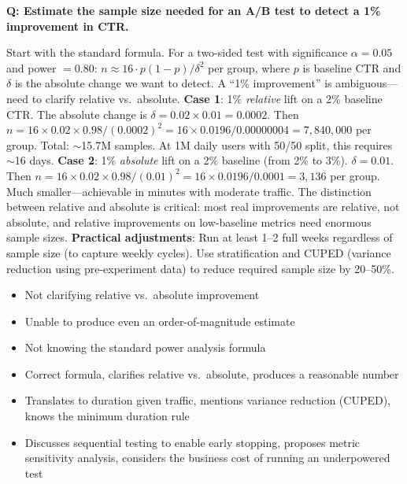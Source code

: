 \begin{interviewq}
\textbf{Q: Estimate the sample size needed for an A/B test to detect a 1\% improvement in CTR.}

 \quad {} \quad \badgefreq{\freqmed}

\stronganswer Start with the standard formula. For a two-sided test with significance $\alpha = 0.05$ and power $= 0.80$: $n \approx 16 \cdot p(1-p) / \delta^2$ per group, where $p$ is baseline CTR and $\delta$ is the absolute change we want to detect. A ``1\% improvement'' is ambiguous---need to clarify relative vs.\ absolute. \textbf{Case 1}: 1\% \textit{relative} lift on a 2\% baseline CTR. The absolute change is $\delta = 0.02 \times 0.01 = 0.0002$. Then $n = 16 \times 0.02 \times 0.98 / (0.0002)^2 = 16 \times 0.0196 / 0.00000004 = 7{,}840{,}000$ per group. Total: $\sim$15.7M samples. At 1M daily users with 50/50 split, this requires $\sim$16 days. \textbf{Case 2}: 1\% \textit{absolute} lift on a 2\% baseline (from 2\% to 3\%). $\delta = 0.01$. Then $n = 16 \times 0.02 \times 0.98 / (0.01)^2 = 16 \times 0.0196 / 0.0001 = 3{,}136$ per group. Much smaller---achievable in minutes with moderate traffic. The distinction between relative and absolute is critical: most real improvements are relative, not absolute, and relative improvements on low-baseline metrics need enormous sample sizes. \textbf{Practical adjustments}: Run at least 1--2 full weeks regardless of sample size (to capture weekly cycles). Use stratification and CUPED (variance reduction using pre-experiment data) to reduce required sample size by 20--50\%.

\redflags
\begin{itemize}
    \item Not clarifying relative vs.\ absolute improvement
    \item Unable to produce even an order-of-magnitude estimate
    \item Not knowing the standard power analysis formula
\end{itemize}


\goodgreat
\begin{itemize}
    \item {} Correct formula, clarifies relative vs.\ absolute, produces a reasonable number
    \item {} Translates to duration given traffic, mentions variance reduction (CUPED), knows the minimum duration rule
    \item {} Discusses sequential testing to enable early stopping, proposes metric sensitivity analysis, considers the business cost of running an underpowered test
\end{itemize}

\end{interviewq}

